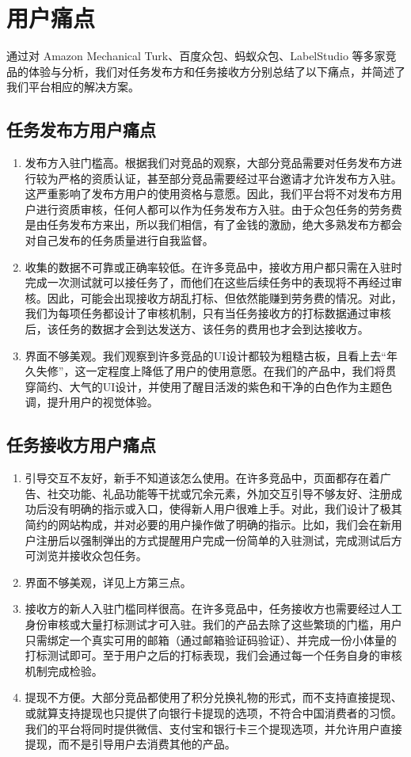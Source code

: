 \section{用户痛点}

通过对 Amazon Mechanical Turk、百度众包、蚂蚁众包、LabelStudio 等多家竞品的体验与分析，我们对任务发布方和任务接收方分别总结了以下痛点，并简述了我们平台相应的解决方案。

\subsection{任务发布方用户痛点}

\begin{enumerate}
    \item 发布方入驻门槛高。根据我们对竞品的观察，大部分竞品需要对任务发布方进行较为严格的资质认证，甚至部分竞品需要经过平台邀请才允许发布方入驻。这严重影响了发布方用户的使用资格与意愿。因此，我们平台将不对发布方用户进行资质审核，任何人都可以作为任务发布方入驻。由于众包任务的劳务费是由任务发布方来出，所以我们相信，有了金钱的激励，绝大多熟发布方都会对自己发布的任务质量进行自我监督。
    \item 收集的数据不可靠或正确率较低。在许多竞品中，接收方用户都只需在入驻时完成一次测试就可以接任务了，而他们在这些后续任务中的表现将不再经过审核。因此，可能会出现接收方胡乱打标、但依然能赚到劳务费的情况。对此，我们为每项任务都设计了审核机制，只有当任务接收方的打标数据通过审核后，该任务的数据才会到达发送方、该任务的费用也才会到达接收方。
    \item 界面不够美观。我们观察到许多竞品的UI设计都较为粗糙古板，且看上去“年久失修”，这一定程度上降低了用户的使用意愿。在我们的产品中，我们将贯穿简约、大气的UI设计，并使用了醒目活泼的紫色和干净的白色作为主题色调，提升用户的视觉体验。
\end{enumerate}

\subsection{任务接收方用户痛点}

\begin{enumerate}
    \item 引导交互不友好，新手不知道该怎么使用。在许多竞品中，页面都存在着广告、社交功能、礼品功能等干扰或冗余元素，外加交互引导不够友好、注册成功后没有明确的指示或入口，使得新人用户很难上手。对此，我们设计了极其简约的网站构成，并对必要的用户操作做了明确的指示。比如，我们会在新用户注册后以强制弹出的方式提醒用户完成一份简单的入驻测试，完成测试后方可浏览并接收众包任务。
    \item 界面不够美观，详见上方第三点。
    \item 接收方的新人入驻门槛同样很高。在许多竞品中，任务接收方也需要经过人工身份审核或大量打标测试才可入驻。我们的产品去除了这些繁琐的门槛，用户只需绑定一个真实可用的邮箱（通过邮箱验证码验证）、并完成一份小体量的打标测试即可。至于用户之后的打标表现，我们会通过每一个任务自身的审核机制完成检验。
    \item 提现不方便。大部分竞品都使用了积分兑换礼物的形式，而不支持直接提现、或就算支持提现也只提供了向银行卡提现的选项，不符合中国消费者的习惯。我们的平台将同时提供微信、支付宝和银行卡三个提现选项，并允许用户直接提现，而不是引导用户去消费其他的产品。
\end{enumerate}